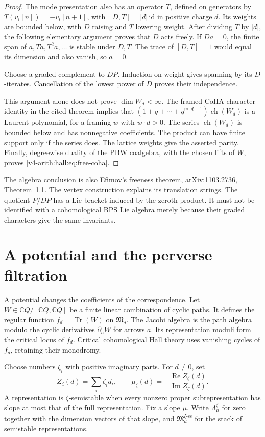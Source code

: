 \begin{proof}
The mode presentation also has an operator $T$, defined on generators
by $T(v_i[n])=-v_i[n+1]$, with
$[D,T]=|d|\,\mathrm{id}$ in positive charge $d$.
Its weights are bounded below, with $D$ raising and $T$ lowering
weight. After dividing $T$ by $|d|$, the following elementary argument
proves that $D$ acts freely. If $Da=0$, the finite span of
$a,Ta,T^2a,\ldots$ is stable under $D,T$. The trace of $[D,T]=1$
would equal its dimension and also vanish, so $a=0$.

Choose a graded complement to $DP$. Induction on weight gives
spanning by its $D$-iterates. Cancellation of the lowest power of
$D$ proves their independence.

This argument alone does not prove $\dim W_d<\infty$.
The framed CoHA character identity in the cited theorem implies
that $(1+q+\cdots+q^{w\cdot d-1})\operatorname{ch}(W_d)$
is a Laurent polynomial, for a framing $w$ with $w\cdot d>0$.
The series $\operatorname{ch}(W_d)$ is bounded below and has
nonnegative coefficients. The product can have finite support only
if the series does. The lattice weights give the asserted parity.
Finally, degreewise duality of the PBW coalgebra, with the chosen
lifts of $W$, proves \eqref{v4-arith:hall:eq:free-coha}.
\end{proof}

The algebra conclusion is also Efimov's freeness theorem,
arXiv:1103.2736, Theorem~1.1. The vertex construction explains
its translation strings. The quotient $P/DP$ has a Lie bracket
induced by the zeroth product. It must not be identified with a
cohomological BPS Lie algebra merely because their graded characters
give the same invariants.

\section{A potential and the perverse filtration}
\label{v4-arith:hall:sec:critical}

A potential changes the coefficients of the correspondence.
Let $W\in\mathbb C Q/[\mathbb C Q,\mathbb C Q]$ be a finite
linear combination of cyclic paths. It defines the regular function
$f_d=\operatorname{Tr}(W)$ on $\mathfrak M_d$.
The Jacobi algebra is the path algebra modulo the cyclic
derivatives $\partial_aW$ for arrows $a$. Its representation
moduli form the critical locus of $f_d$. Critical cohomological Hall theory uses
vanishing cycles of $f_d$, retaining their monodromy.

Choose numbers $\zeta_i$ with positive imaginary parts. For $d\ne0$, set
\[
 Z_\zeta(d)=\sum_i\zeta_i d_i,\qquad
 \mu_\zeta(d)=-\frac{\operatorname{Re}Z_\zeta(d)}{\operatorname{Im}Z_\zeta(d)}.
\]
A representation is $\zeta$-semistable when every nonzero proper
subrepresentation has slope at most that of the full representation.
Fix a slope $\mu$.
Write $\Lambda^\zeta_\mu$ for zero together with the dimension
vectors of that slope, and $\mathfrak M_d^{\zeta\text{-ss}}$
for the stack of semistable representations.

